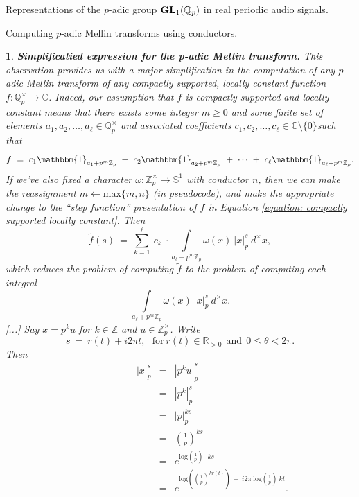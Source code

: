 \documentclass[letterpaper,11pt, reqno]{amsart}
\newtheorem{monodromy theorem}{Monodromy Theorem}[subsection]
\newtheorem{wild conjecture}[theorem]{Wild Conjecture}
\newtheorem{research objectives}{Research objectives}[subsection]
\newtheorem{research question}[theorem]{Research questions}
\newtheorem{aside question}[theorem]{Aside question}
\newtheorem{audio example}[theorem]{\loudspeaker[3] Example}
\newtheorem{blank remark}[theorem]{}
\newtheorem{ssubsection}[theorem]{}
\newtheorem{terminology and comment}[theorem]{Terminology and comment}
\newtheorem{purity hypothesis}[theorem]{Purity hypothesis}
\newtheorem{corollary of the purity hypothesis}[theorem]{Corollary of the purity hypothesis}
\newcommand{\CC} {{\mathbb C}}
\newcommand{\QQ} {{\mathbb Q}}
\newcommand{\RR} {{\mathbb R}}
\newcommand{\ZZ} {{\mathbb Z}}
\newcommand{\lra}{{\longrightarrow}}
\numberwithin{equation}{theorem}
\begin{document}
\begin{section}{Representations of the $p$-adic group $\bold{GL}_{1}(\mathbb{Q}_{p})$
in real periodic audio signals.}
\begin{subsection}{Computing $p$-adic Mellin transforms using conductors.}
\begin{ssubsection}\label{ssubsection: simplifying Mellin transform}
{{\bf Simplificatied expression for the {\em p}-adic Mellin transform.}}
\normalfont
	This observation provides us with a major simplification in the computation of any $p$-adic Mellin transform of any compactly supported, locally constant function $f:\QQ^\times_p\lra\CC$. Indeed, our assumption that $f$ is compactly supported and locally constant means that there exists some integer $m\ge 0$ and some finite set of elements $a_1,a_2,\dots,a_\ell\in\QQ^\times_p$ and associated coefficients $c_1,c_2,\dots,c_\ell\in\CC\setminus\{0\}$such that
	\begin{equation}\label{equation: compactly supported locally constant}
	f
	\ =\ 
	c_1\mathbbm{1}_{a_1+p^m\ZZ_p}
	\ +\ 
	c_2\mathbbm{1}_{a_2+p^m\ZZ_p}
	\ +\ 
	\cdots
	\ +\ 
	c_\ell\mathbbm{1}_{a_\ell+p^m\ZZ_p}.
	\end{equation}
If we've also fixed a character $\omega:\ZZ^\times_p\lra\mathbb{S}^1$ with conductor $n$, then we can make the reassignment $m\leftarrow\text{max}\{m,n\}$ (in pseudocode), and make the appropriate change to the ``step function'' presentation of $f$ in Equation \eqref{equation: compactly supported locally constant}. Then
	\begin{equation}\label{equation: sum breakdown for Mellin transform}
	\widetilde{f}(s)
	\ =\ 
	\sum^{\ell}_{k=1}\ c_{k}\ \cdot\!\!\!\!\!\!\!\underset{{a_\ell+p^m\ZZ_p}}{\int}
	\!\!\!\!\!\omega(x)\ |x|^{s}_{p}\ d^\times\!x,
	\end{equation}
which reduces the problem of computing $\widetilde{f}$ to the problem of computing each integral
	$$
	\underset{{a_\ell+p^m\ZZ_p}}{\int}
	\!\!\!\!\!\omega(x)\ |x|^{s}_{p}\ d^\times\!x.
	$$
{\color{red} [...]}
Say $x=p^ku$ for $k\in\ZZ$ and $u\in\ZZ^\times_p$. Write $$s\ =\ r(t)+i2\pi t,\ \ \ \text{for}\ r(t)\in\RR_{>0}\ \ \text{and}\ \ 0\le \theta<2\pi.$$ Then
	$$
	\ \ \ \ \ \ \ \ \ \ \ \ \ \ \ \ \ \ \ \ \ \ \ \ \ \ \ \ \ \ 
	\begin{array}{rcl}
	|x|^{s}_p
	&
	\!\!=\!\!
	&
	|p^ku|^{s}_p
	\\[10pt]
	&
	\!\!=\!\!
	&
	|p^k|^{s}_p
	\\[10pt]
	&
	\!\!=\!\!
	&
	|p|^{ks}_p
	\\[10pt]
	&
	\!\!=\!\!
	&
	\left(\frac{1}{p}\right)^{\!\!ks}
	\\[10pt]
	&
	\!\!=\!\!
	&
	e^{\text{log}(\tfrac{1}{p})\cdot ks}
	\\[10pt]
	&
	\!\!=\!\!
	&
	e^{\text{log}(\left(\tfrac{1}{p}\right)^{\!kr(t)})\ +\ i2\pi\ \!\text{log}(\tfrac{1}{p})\ \!kt}.

\end{array}$$
\end{ssubsection}
\end{subsection}
\end{section}
\end{document}
